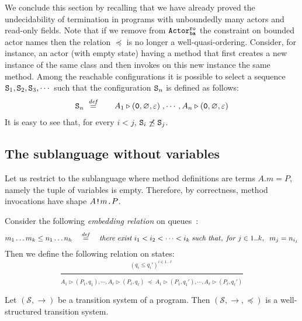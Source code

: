 \documentclass{LMCS}
\newcommand{\cal}{\mathcal}
\theoremstyle{plain}\newtheorem{proposition}[thm]{Proposition}
\theoremstyle{plain}\newtheorem{lemma}[thm]{Lemma}
\theoremstyle{plain}\newtheorem{theorem}[thm]{Theorem}
\theoremstyle{plain}\newtheorem{corollary}[thm]{Corollary}
\newcommand{\bigfract}[2]{\frac{^{\textstyle #1}}{_{\textstyle #2}}}
\newcommand{\pinull}{{\tt 0}}
\newcommand{\invk}{\mbox{\tt !}}
\newcommand{\prefix}{\mbox{\tt .}}
\newcommand{\State}{{\tt S}}
\newcommand{\lred}[1]{\stackrel{#1}{\longrightarrow}}
\newcommand{\eqdef}{\stackrel{{\it def}}{=}}
\newcommand{\actroba}{${\tt Actor^{\tt ro}_{\tt ba}}$}
\begin{document}
We conclude this section by recalling that 
we have already proved
the undecidability of termination in programs with unboundedly many 
actors and read-only fields.
Note that 
if we remove from {\actroba} the constraint on bounded actor names
then  the relation $\preceq$ is no longer a well-quasi-ordering.
Consider, for instance, an actor (with empty state) having a method 
that first creates a new instance of the same class and then invokes 
on this new instance the same method. Among the reachable configurations
it is possible to select a sequence 
$\State_1, \State_2, \State_3, \cdots$ such that
the configuration $\State_n$ is defined as follows:
\[
\begin{array}{r@{\qquad}l}
\State_n \; \eqdef & A_1 \triangleright (\pinull, \varnothing, \varepsilon) \; , 
\cdots ,  A_n \triangleright (\pinull, \varnothing,  \varepsilon)
\end{array}
\]
It is easy to see that, 
for every $i < j$,  $\State_i \not \preceq 
\State_j$. 



\iffalse
\subsection{The sublanguage without variables}
Let us restrict to the sublanguage where method definitions 
are terms $A.m = P$, namely the tuple of variables is empty. Therefore,
by correctness, method invocations have shape $A \invk m \prefix P$.


Consider the following \emph{embedding relation} on queues~\cite{Finkel:2001}:
\[
m_1 \ldots m_k \le n_1 \ldots n_h \quad \eqdef \quad
{\it there \; exist} \; i_1 < i_2 < \cdots < i_k \; 
{\it such \; that, \; for} \; j \in 1..k,  \; \; m_j = n_{i_j}
\]
Then we define the following relation on states:
\[
\bigfract{ (q_i \leq q_i')^{i \in 1..\ell}
	}{
	 A_1 \triangleright (P_1, q_1), \cdots , A_\ell \triangleright (P_\ell, q_\ell) 
 \; \preceq \; A_1 \triangleright (P_1, q_1'), \cdots , A_\ell \triangleright 
 (P_\ell, q_\ell')
 }
\]



\begin{thm}
Let $({\cal S},\lred{})$ be a transition system of a program. 
Then $({\cal S}, \lred{}, \preceq)$ is a well-structured transition system.
\end{thm}
\end{document}
